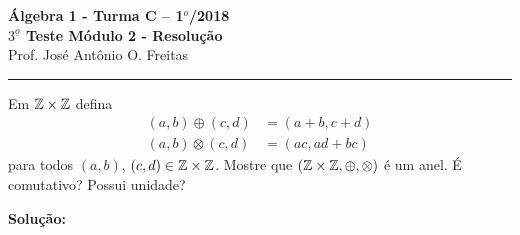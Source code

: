 \documentclass[12pt]{article}
\begin{document}


\begin{center}
{\Large\bf {\'A}lgebra 1 - Turma C -- 1$^{o}$/2018} \\ \vspace{9pt} {\large\bf
  $3^{\underline{o}}$ Teste M\'odulo 2 - Resolu\c{c}\~ao}\\
\vspace{9pt} Prof. Jos{\'e} Ant{\^o}nio O. Freitas
\end{center}
\hrule

\vspace{.6cm}

\questao Em $\mathbb{Z} \times \mathbb{Z}$ defina
\begin{align*}
	(a, b) \oplus (c,d) &= (a + b, c + d)\\
	(a, b) \otimes (c, d) &= (ac, ad + bc)
\end{align*}
para todos $(a, b)$, $(c, d) \in \mathbb{Z} \times \mathbb{Z}$. Mostre que $(\mathbb{Z} \times \mathbb{Z}, \oplus, \otimes)$ é um anel. É comutativo? Possui unidade?

\noindent\textbf{Solu\c{c}\~ao:}
\end{document}

